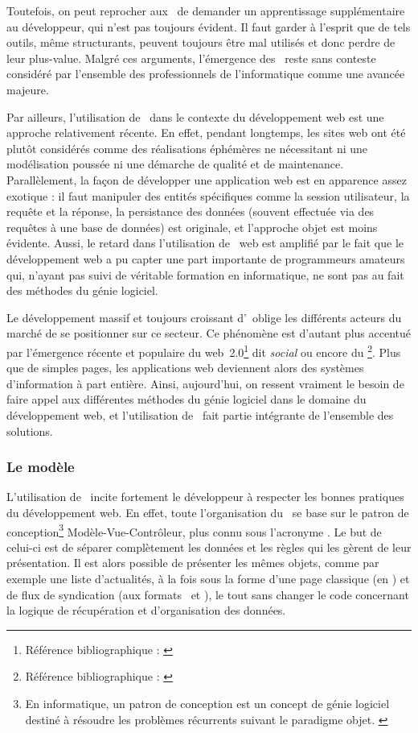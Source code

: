 Toutefois, on peut reprocher aux \afms\ de demander un apprentissage supplémentaire au développeur, qui n'est pas toujours évident. Il faut garder à l'esprit que de tels outils, même structurants, peuvent toujours être mal utilisés et donc perdre de leur plus-value. Malgré ces arguments, l'émergence des \afms\ reste sans conteste considéré par l'ensemble des professionnels de l'informatique comme une avancée majeure.

Par ailleurs, l'utilisation de \afms\ dans le contexte du développement web est une approche relativement récente. En effet, pendant longtemps, les sites web ont été plutôt considérés comme des réalisations éphémères ne nécessitant ni une modélisation poussée ni une démarche de qualité et de maintenance. Parallèlement, la façon de développer une application web est en apparence assez exotique : il faut manipuler des entités spécifiques comme la session utilisateur, la requête et la réponse, la persistance des données (souvent effectuée via des requêtes à une base de données) est originale, et l'approche objet est moins évidente. Aussi, le retard dans l'utilisation de \afms\ web est amplifié par le fait que le développement web a pu capter une part importante de programmeurs amateurs qui, n'ayant pas suivi de véritable formation en informatique, ne sont pas au fait des méthodes du génie logiciel.

Le développement massif et toujours croissant d'\ainternet\ oblige les dif\-fé\-rents acteurs du marché de se positionner sur ce secteur. Ce phénomène est d'autant plus accentué par l'émergence récente et populaire du web~2.0\footnote{Référence bibliographique : \cite{webdeux}} dit \emph{social} ou encore du \acloud\footnote{Référence bibliographique : \cite{cloud}}. Plus que de simples pages, les applications web deviennent alors des systèmes d'information à part entière. Ainsi, aujourd'hui, on ressent vraiment le besoin de faire appel aux différentes méthodes du génie logiciel dans le domaine du développement web, et l'utilisation de \afm\ fait partie intégrante de l'ensemble des solutions.


\subsubsection{Le modèle \amvc}

L'utilisation de \asf\ incite fortement le développeur à respecter les bonnes pratiques du développement web. En effet, toute l'organisation du \afm\ se base sur le patron de conception\footnote{En informatique, un patron de conception est un concept de génie logiciel destiné à résoudre les problèmes récurrents suivant le paradigme objet. \cite{designpattern}} Modèle-Vue-Contrôleur, plus connu sous l'acronyme \amvc. Le but de celui-ci est de séparer complètement les données et les
règles qui les gèrent de leur présentation. Il est alors possible de présenter les mêmes objets, comme par exemple une liste d'actualités, à la fois sous la forme d'une page classique (en \ahtml) et de flux de syndication (aux formats \arss\ et \aatom), le tout sans changer le code concernant la logique de récupération et d'organisation des données.

